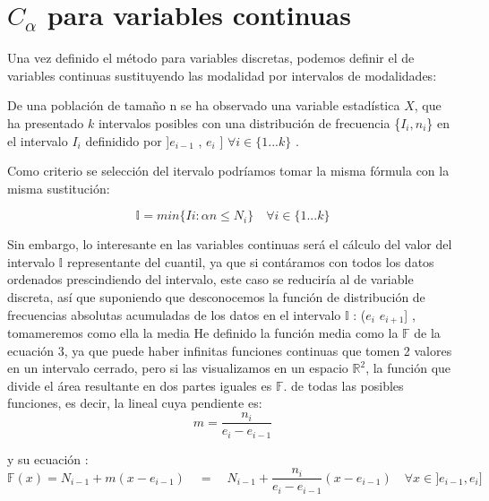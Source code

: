 \documentclass[a4paper , 11pt, spanish ]{article}
\begin{document}
\section*{$C_{ \alpha}$ para variables continuas } 
Una vez definido el método para variables discretas, podemos definir el de variables continuas sustituyendo las modalidad por intervalos de modalidades: 
\par 
De una población de tamaño n se ha observado una variable estadística $X$, que ha presentado $k$ intervalos posibles con una distribución de frecuencia \{$ I_{i} , n_{i}$\} en el intervalo $I_{i}$ definidido por ]$e_{i-1}$ , $e_{i}$ ]	 $\forall i \in \{1...k\}$ .
\par
Como criterio se selección del itervalo podríamos tomar la misma fórmula con la misma sustitución: 

\begin{equation}
 \mathbb{I}= min \{ I{i} : \alpha n \leq N_{i}\} \quad \forall i \in \{1...k\}
\end{equation}
\par 
Sin embargo, lo interesante en las variables continuas será el cálculo del valor del intervalo $\mathbb{I} $ representante del cuantil, ya que si contáramos con todos los datos ordenados prescindiendo del intervalo, este caso se reduciría al de variable discreta, así que suponiendo que desconocemos la función de distribución de frecuencias absolutas acumuladas 
de los datos en el intervalo $\mathbb{I} $ : ($e_{i}$ $e_{i+1}$] , tomameremos como ella la media 
\endnote
{ 
He definido la función media como la $\mathbb{F}$ de la ecuación 3, ya que puede haber infinitas funciones continuas que tomen 2 valores en un intervalo cerrado, pero si las visualizamos en un espacio $ \mathbb{R}^2$, la función que divide el área resultante en dos partes iguales es $\mathbb{F}$.
} 
de todas las posibles funciones, es decir, la lineal cuya pendiente es: $$ m= \frac{n_{i}}{ e_{i}-e_{i-1} }$$ 
\par y su ecuación : 
\begin{equation}
 \mathbb{F}(x) = N_{i-1} + m ( x-e_{i-1}) \quad =  \quad N_{i-1} + \frac{n_{i}}{ e_{i}-e_{i-1} } ( x-e_{i-1}) \quad \forall x \in ]e_{i-1}, e_{i} ] 
\end{equation}
\end{document}
